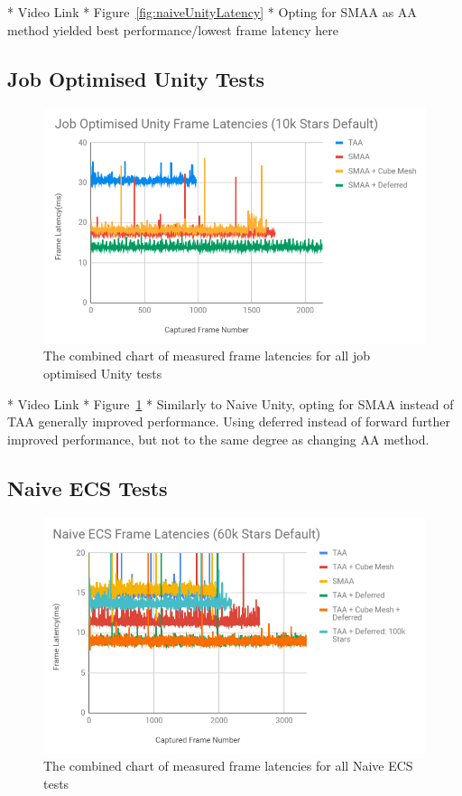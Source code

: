 * Video Link
* Figure~\ref{fig:naiveUnityLatency}
* Opting for SMAA as AA method yielded best performance/lowest frame latency here

\subsection{Job Optimised Unity Tests}
\begin{figure}[!p]
    \centering
    \includegraphics[width=1\textwidth]{Figures/jobOptimisedUnityLatencies.png}
    \caption[Combined Frame Latency Chart for Job Optimised Unity Tests]{The combined chart of measured frame latencies for all job optimised Unity tests}
    \label{fig:jobOptimisedUnityLatency}
\end{figure}

* Video Link
* Figure~\ref{fig:jobOptimisedUnityLatency}
* Similarly to Naive Unity, opting for SMAA instead of TAA generally improved performance. Using deferred instead of forward further improved performance, but not to the same degree as changing AA method.

\subsection{Naive ECS Tests}
\begin{figure}[!p]
    \centering
    \includegraphics[width=1\textwidth]{Figures/naiveEcsLatencies.png}
    \caption[Combined Frame Latency Chart for Unity Tests]{The combined chart of measured frame latencies for all Naive ECS tests}
    \label{fig:naiveEcsUnityLatency}
\end{figure}

